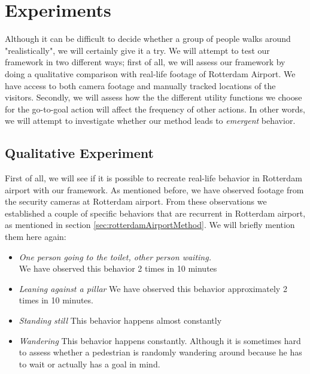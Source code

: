 \documentclass[11pt, a4paper]{book}
\begin{document}
\chapter{Experiments}
\label{chap:experiments}
Although it can be difficult to decide whether a group of people walks around "realistically", we will certainly give it a try. We will attempt to test our framework in two different ways; first of all, we will assess our framework by doing a qualitative comparison with real-life footage of Rotterdam Airport. We have access to both camera footage and manually tracked locations of the visitors.
Secondly, we will assess how the the different utility functions we choose for the go-to-goal action will affect the frequency of other actions. In other words, we will attempt to investigate whether our method leads to \emph{emergent} behavior.


\section{Qualitative Experiment}
First of all, we will see if it is possible to recreate real-life behavior in Rotterdam airport with our framework. As mentioned before, we have observed footage from the security cameras at Rotterdam airport. From these observations we established a couple of specific behaviors that are recurrent in Rotterdam airport, as mentioned in section \ref{sec:rotterdamAirportMethod}. We will briefly mention them here again:
\begin{itemize}
\item \emph{One person going to the toilet, other person waiting.}\\
We have observed this behavior 2 times in 10 minutes
\item \emph{Leaning against a pillar}
We have observed this behavior approximately 2 times in 10 minutes.
\item \emph{Standing still}
This behavior happens almost constantly
\item \emph{Wandering}
This behavior happens constantly. Although it is sometimes hard to assess whether a pedestrian is randomly wandering around because he has to wait or actually has a goal in mind.
\end{itemize}
\end{document}
